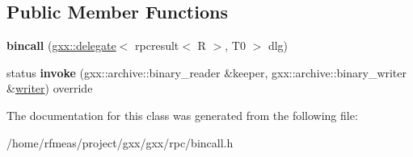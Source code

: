 \subsection*{Public Member Functions}
\begin{DoxyCompactItemize}
\item 
{\bfseries bincall} (\hyperlink{classgxx_1_1delegate}{gxx\+::delegate}$<$ rpcresult$<$ R $>$, T0 $>$ dlg)\hypertarget{classgxx_1_1rpc_1_1bincall_3_01gxx_1_1delegate_3_01rpcresult_3_01R_01_4_00_01T0_01_4_01_4_a4d2c5c3569c5b0a4de9ce745a16092ba}{}\label{classgxx_1_1rpc_1_1bincall_3_01gxx_1_1delegate_3_01rpcresult_3_01R_01_4_00_01T0_01_4_01_4_a4d2c5c3569c5b0a4de9ce745a16092ba}

\item 
status {\bfseries invoke} (gxx\+::archive\+::binary\+\_\+reader \&keeper, gxx\+::archive\+::binary\+\_\+writer \&\hyperlink{classgxx_1_1writer}{writer}) override\hypertarget{classgxx_1_1rpc_1_1bincall_3_01gxx_1_1delegate_3_01rpcresult_3_01R_01_4_00_01T0_01_4_01_4_ac91d5c6d7486bdc78c85755429d00f7c}{}\label{classgxx_1_1rpc_1_1bincall_3_01gxx_1_1delegate_3_01rpcresult_3_01R_01_4_00_01T0_01_4_01_4_ac91d5c6d7486bdc78c85755429d00f7c}

\end{DoxyCompactItemize}


The documentation for this class was generated from the following file\+:\begin{DoxyCompactItemize}
\item 
/home/rfmeas/project/gxx/gxx/rpc/bincall.\+h\end{DoxyCompactItemize}
